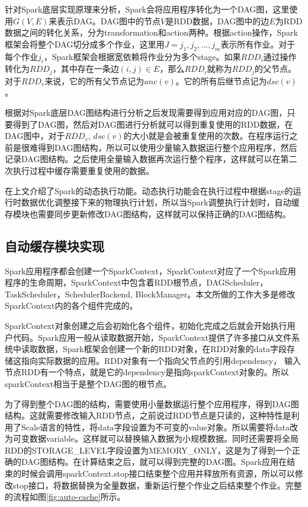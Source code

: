 针对Spark底层实现原理来分析，Spark会将应用程序转化为一个DAG图，这里使用$G(V, E)$来表示DAG。DAG图中的节点$V$是RDD数据，DAG图中的边$E$为RDD数据之间的转化关系，分为transformation和action两种。根据action操作，Spark框架会将整个DAG切分成多个作业，这里用$J={j_1, j_2,...,j_m }$表示所有作业。对于每个作业$j_i$，Spark框架会根据宽依赖将作业分为多个stage。如果$RDD_i$通过操作转化为$RDD_j$，其中存在一条边$(i, j)\in E$，那么$RDD_i$就称为$RDD_j$的父节点。对于$RDD_v$来说，它的所有父节点记为$anc(v)$。它的所有后继节点记为$dsc(v)$。

根据对Spark底层DAG图结构进行分析之后发现需要得到应用对应的DAG图，只要得到了DAG图，然后对DAG图进行分析就可以得到重复使用的RDD数据，在DAG图中，对于$RDD_v$, $dsc(v)$的大小就是会被重复使用的次数。在程序运行之前是很难得到DAG图结构，所以可以使用少量输入数据运行整个应用程序，然后记录DAG图结构。之后使用全量输入数据再次运行整个程序，这样就可以在第二次执行过程中缓存需要重复使用的数据。

在上文介绍了Spark的动态执行功能。动态执行功能会在执行过程中根据stage的运行时数据优化调整接下来的物理执行计划，所以当Spark调整执行计划时，自动缓存模块也需要同步更新修改DAG图结构，这样就可以保持正确的DAG图结构。

\subsection{自动缓存模块实现}
Spark应用程序都会创建一个SparkContext，SparkContext对应了一个Spark应用程序的生命周期，SparkContext中包含着RDD根节点，DAGScheduler，TaskScheduler，SchedulerBackend, BlockManager。本文所做的工作大多是修改SparkContext内的各个组件完成的。

SparkContext对象创建之后会初始化各个组件，初始化完成之后就会开始执行用户代码。Spark应用一般从读取数据开始，SparkContext提供了许多接口从文件系统中读取数据，Spark框架会创建一个新的RDD对象，在RDD对象的data字段存储这指向实际数据的应用。RDD对象有一个指向父节点的引用dependency， 输入节点RDD有一个特点，就是它的dependency是指向sparkContext对象的。所以sparkContext相当于是整个DAG图的根节点。

为了得到整个DAG图的结构，需要使用小量数据运行整个应用程序，得到DAG图结构。这就需要修改输入RDD节点，之前说过RDD节点是只读的，这种特性是利用了Scale语言的特性，将data字段设置为不可变的value对象。所以需要将data改为可变数据variable。这样就可以替换输入数据为小规模数据。同时还需要将全局RDD的STORAGE\_LEVEL字段设置为MEMORY\_ONLY，这是为了得到一个正确的DAG图结构。在计算结束之后，就可以得到完整的DAG图。Spark应用在结束的时候会调用sparkContext.stop接口结束整个应用并释放所有资源，所以可以修改stop接口，将数据替换为全量数据，重新运行整个作业之后结束整个作业。完整的流程如图\ref{fig:auto-cache}所示。


